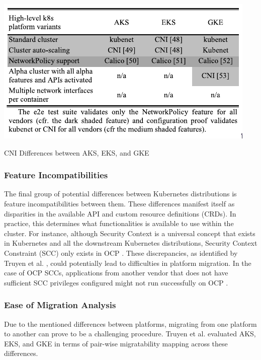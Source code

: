\begin{table}
    \centering
    \includegraphics[width=0.6\linewidth]{resources/Pasted image 20241123082858.png}
    \caption{CNI Differences between AKS, EKS, and GKE \cite{truyenManagingFeatureCompatibility2020}}
    \label{tab:kube-distro-cni-diff}
\end{table}

\FloatBarrier

\subsubsection{Feature Incompatibilities}


The final group of potential differences between Kubernetes distributions is feature incompatibilities between them. These differences manifest itself as disparities in the available API and custom resource definitions (CRDs). In practice, this determines what functionalities is available to use within the cluster. For instance, although Security Context is a universal concept that exists in Kubernetes and all the downstream Kubernetes distributions, Security Context Constraint (SCC) only exists in OCP \cite{ConfigureSecurityContext, ManagingSecurityContext}. These discrepancies, as identified by Truyen et al. \cite{truyenManagingFeatureCompatibility2020}, could potentially lead to difficulties in platform migration. In the case of OCP SCCs, applications from another vendor that does not have sufficient SCC privileges configured might not run successfully on OCP \cite{ConfigureSecurityContext}.

\subsubsection{Ease of Migration Analysis}

Due to the mentioned differences between platforms, migrating from one platform to another can prove to be a challenging procedure. Truyen et al. \cite{cloudnativecomputingfoundationFrequentlyAskedQuestions2018} evaluated AKS, EKS, and GKE in terms of pair-wise migratability mapping across these differences. 

